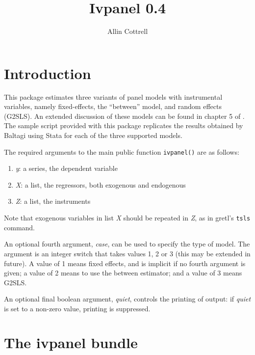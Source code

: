 \documentclass{article}
\begin{document}
\setlength{\parindent}{0pt}
\setlength{\parskip}{1ex}

\newcommand{\argname}[1]{\textsl{#1}}

\title{Ivpanel 0.4}
\author{Allin Cottrell}
\maketitle

\section{Introduction}

This package estimates three variants of panel models with
instrumental variables, namely fixed-effects, the ``between'' model,
and random effects (G2SLS). An extended discussion of these models can
be found in chapter 5 of \cite{baltagi05}. The sample script provided
with this package replicates the results obtained by Baltagi using
\textsf{Stata} for each of the three supported models.

The required arguments to the main public function \texttt{ivpanel()}
are as follows:

\begin{enumerate}
\item \argname{y}: a series, the dependent variable
\item \argname{X}: a list, the regressors, both exogenous and endogenous
\item \argname{Z}: a list, the instruments
\end{enumerate}

Note that exogenous variables in list \argname{X} should be repeated in
\argname{Z}, as in gretl's \texttt{tsls} command.

An optional fourth argument, \argname{case}, can be used to specify the
type of model. The argument is an integer switch that takes values 1,
2 or 3 (this may be extended in future).  A value of 1 means fixed
effects, and is implicit if no fourth argument is given; a value of 2
means to use the between estimator; and a value of 3 means G2SLS.

An optional final boolean argument, \argname{quiet}, controls the
printing of output: if \argname{quiet} is set to a non-zero value,
printing is suppressed.

\section{The ivpanel bundle}
\end{document}
